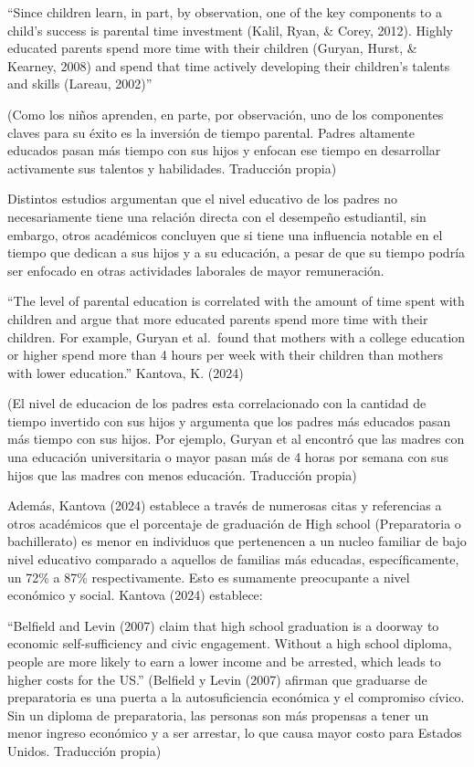 \documentclass[
]{article}
\begin{document}
``Since children learn, in part, by observation, one of the key
components to a child's success is parental time investment (Kalil,
Ryan, \& Corey, 2012). Highly educated parents spend more time with
their children (Guryan, Hurst, \& Kearney, 2008) and spend that time
actively developing their children's talents and skills (Lareau, 2002)''

(Como los niños aprenden, en parte, por observación, uno de los
componentes claves para su éxito es la inversión de tiempo parental.
Padres altamente educados pasan más tiempo con sus hijos y enfocan ese
tiempo en desarrollar activamente sus talentos y habilidades. Traducción
propia)

Distintos estudios argumentan que el nivel educativo de los padres no
necesariamente tiene una relación directa con el desempeño estudiantil,
sin embargo, otros académicos concluyen que si tiene una influencia
notable en el tiempo que dedican a sus hijos y a su educación, a pesar
de que su tiempo podría ser enfocado en otras actividades laborales de
mayor remuneración.

``The level of parental education is correlated with the amount of time
spent with children and argue that more educated parents spend more time
with their children. For example, Guryan et al.~found that mothers with
a college education or higher spend more than 4 hours per week with
their children than mothers with lower education.'' Kantova, K. (2024)

(El nivel de educacion de los padres esta correlacionado con la cantidad
de tiempo invertido con sus hijos y argumenta que los padres más
educados pasan más tiempo con sus hijos. Por ejemplo, Guryan et al
encontró que las madres con una educación universitaria o mayor pasan
más de 4 horas por semana con sus hijos que las madres con menos
educación. Traducción propia)

Además, Kantova (2024) establece a través de numerosas citas y
referencias a otros académicos que el porcentaje de graduación de High
school (Preparatoria o bachillerato) es menor en individuos que
pertenencen a un nucleo familiar de bajo nivel educativo comparado a
aquellos de familias más educadas, específicamente, un 72\% a 87\%
respectivamente. Esto es sumamente preocupante a nivel económico y
social. Kantova (2024) establece:

``Belfield and Levin (2007) claim that high school graduation is a
doorway to economic self-sufficiency and civic engagement. Without a
high school diploma, people are more likely to earn a lower income and
be arrested, which leads to higher costs for the US.'' (Belfield y Levin
(2007) afirman que graduarse de preparatoria es una puerta a la
autosuficiencia económica y el compromiso cívico. Sin un diploma de
preparatoria, las personas son más propensas a tener un menor ingreso
económico y a ser arrestar, lo que causa mayor costo para Estados
Unidos. Traducción propia)
\end{document}
